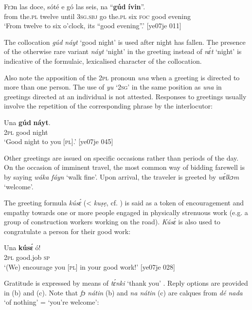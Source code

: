\ea%
    \label{ex:key:1691}
    \gll Frɔn    las    doce,  sóté    e    gó  las    seis,
na  “\textbf{gúd}    \textbf{ívin}”.\\
from  the.\textsc{pl}  twelve  until  \textsc{3sg.sbj}  go  the.\textsc{pl}  six  
\textsc{foc}  good  evening\\
\glt ‘From twelve to six o’clock, its “good evening”.’ [ye07je 011]
\z

The collocation \textit{gúd náyt} ‘good night’ is used after night has fallen. The presence of the otherwise rare variant \textit{náyt} ‘night’ in the greeting instead of \textit{nɛ́t} ‘night’ is indicative of the formulaic, lexicalised character of the collocation. 


Also note the apposition of the \textsc{2pl} pronoun \textit{una} when a greeting is directed to more than one person. The use of \textit{yu} ‘\textsc{2sg}’ in the same position as \textit{una} in greetings directed at an individual is not attested. Responses to greetings usually involve the repetition of the corresponding phrase by the interlocutor:



\ea%
    \label{ex:key:1692}
    \gll Una    \textbf{gúd}    \textbf{náyt}.\\
\textsc{2pl}    good  night\\

\glt ‘Good night to you [\textsc{pl}].’ [ye07je 045]
\z

Other greetings are issued on specific occasions rather than periods of the day. On the occasion of imminent travel, the most common way of bidding farewell is by saying \textit{wáka fáyn} ‘walk fine’. Upon arrival, the traveler is greeted by \textit{wɛ́lkɔm} ‘welcome’. 

The greeting formula \textit{kúsɛ́} (<  \textit{kuṣẹ},  cf. \citealt{Abraham1958}) is said as a token of encouragement and empathy towards one or more people engaged in physically strenuous work (e.g. a group of construction workers working on the road). \textit{Kúsɛ́} is also used to congratulate a person for their good work:


\ea%
    \label{ex:key:1693}
    \gll Una  \textbf{kúsɛ́}  ó!\\
\textsc{2pl}  good.job  \textsc{sp}\\

\glt ‘(We) encourage you [\textsc{pl}] in your good work!’ [ye07je 028]
\z

Gratitude is expressed by means of \textit{tɛ́nki} ‘thank you’ . Reply options are provided in (b) and (c). Note that \textit{fɔ nátin} (b) and \textit{na nátin} (c) are calques{\fff} from  \textit{dé nada} ‘of nothing’ = ‘you’re welcome’: 


